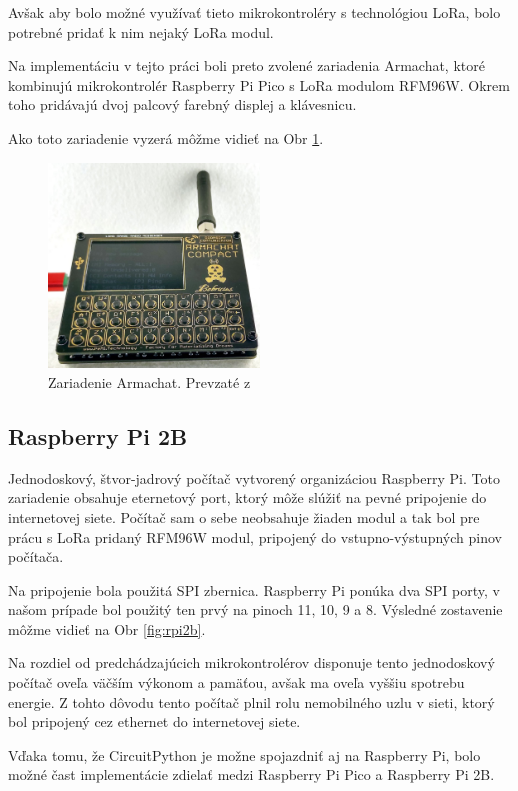 \documentclass[slovak,master]{diploma}
\begin{document}
Avšak aby bolo možné využívať tieto mikrokontroléry s technológiou LoRa, bolo potrebné pridať k nim nejaký LoRa modul.

Na implementáciu v tejto práci boli preto zvolené zariadenia Armachat, ktoré kombinujú mikrokontrolér Raspberry Pi Pico s LoRa modulom RFM96W.
Okrem toho pridávajú dvoj palcový farebný displej a klávesnicu.

Ako toto zariadenie vyzerá môžme vidieť na Obr \ref{fig:armachat}.

\begin{figure}[h!]
	\centering
	\includegraphics[width=0.5\textwidth]{Figures/armachat.jpg}
	\caption{Zariadenie Armachat. Prevzaté z \cite{armachatObr}}
	\label{fig:armachat}
\end{figure}
\newpage

\subsection{Raspberry Pi 2B}
Jednodoskový, štvor-jadrový počítač vytvorený organizáciou Raspberry Pi. 
Toto zariadenie obsahuje eternetový port, ktorý môže slúžiť na pevné pripojenie do internetovej siete.
Počítač sam o sebe neobsahuje žiaden modul a tak bol pre prácu s LoRa pridaný RFM96W modul, pripojený do vstupno-výstupných pinov počítača.

Na pripojenie bola použitá SPI zbernica. Raspberry Pi ponúka dva SPI porty, v našom prípade bol použitý ten prvý na pinoch 11, 10, 9 a 8. 
Výsledné zostavenie môžme vidieť na Obr \ref{fig:rpi2b}.

Na rozdiel od predchádzajúcich mikrokontrolérov disponuje tento jednodoskový počítač oveľa väčším výkonom a pamäťou, 
avšak ma oveľa vyššiu spotrebu energie. Z tohto dôvodu tento počítač plnil rolu nemobilného uzlu v sieti, ktorý bol pripojený cez ethernet do internetovej siete.

Vďaka tomu, že CircuitPython je možne spojazdniť aj na Raspberry Pi, bolo možné čast implementácie zdielať medzi Raspberry Pi Pico a Raspberry Pi 2B.
\end{document}
